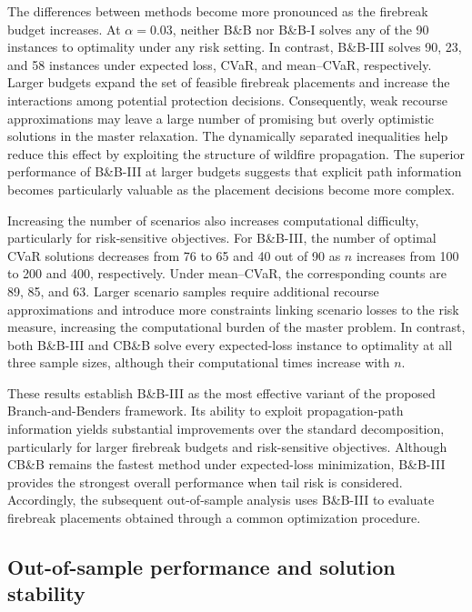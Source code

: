 \documentclass[a4paper,fleqn]{cas-sc}
\begin{document}
The differences between methods become more pronounced as the firebreak budget increases. At $\alpha=0.03$, neither B\&B nor B\&B-I solves any of the 90 instances to optimality under any risk setting. In contrast, B\&B-III solves 90, 23, and 58 instances under expected loss, CVaR, and mean--CVaR, respectively. Larger budgets expand the set of feasible firebreak placements
and increase the interactions among potential protection decisions. Consequently, weak recourse approximations may leave a large number of promising but overly optimistic solutions in the master relaxation. The dynamically separated inequalities help reduce
this effect by exploiting the structure of wildfire propagation. The superior performance of B\&B-III at larger budgets suggests that explicit path information becomes particularly valuable as the placement decisions become more complex.

Increasing the number of scenarios also increases computational difficulty, particularly for risk-sensitive objectives. For B\&B-III, the number of optimal CVaR solutions decreases from 76 to 65 and 40 out of 90 as $n$ increases from 100 to 200 and 400, respectively. Under mean--CVaR, the corresponding counts are 89, 85, and 63. Larger scenario samples require additional recourse approximations and introduce more constraints linking scenario losses to the risk measure, increasing the computational burden of the master problem. In contrast, both B\&B-III and CB\&B solve every expected-loss instance to optimality at all three sample sizes, although their computational times increase with $n$.

These results establish B\&B-III as the most effective variant of the proposed Branch-and-Benders framework. Its ability to exploit propagation-path information yields substantial improvements over the standard decomposition, particularly for larger firebreak budgets and risk-sensitive objectives. Although CB\&B remains the fastest method under expected-loss minimization, B\&B-III provides the strongest overall performance
when tail risk is considered. Accordingly, the subsequent
out-of-sample analysis uses B\&B-III to evaluate firebreak placements obtained through a common optimization procedure.
\FloatBarrier

\subsection{Out-of-sample performance and solution stability}\label{sec:oos-stability}
\end{document}
